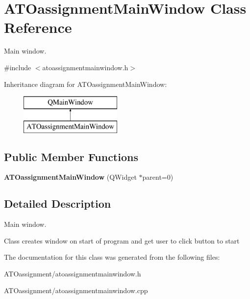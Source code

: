 \hypertarget{class_a_t_oassignment_main_window}{}\section{A\+T\+Oassignment\+Main\+Window Class Reference}
\label{class_a_t_oassignment_main_window}


Main window.  




{\ttfamily \#include $<$atoassignmentmainwindow.\+h$>$}

Inheritance diagram for A\+T\+Oassignment\+Main\+Window\+:\begin{figure}[H]
\begin{center}
\leavevmode
\includegraphics[height=2.000000cm]{class_a_t_oassignment_main_window}
\end{center}
\end{figure}
\subsection*{Public Member Functions}
\begin{DoxyCompactItemize}
\item 
\hypertarget{class_a_t_oassignment_main_window_a443871b5a99b1725e128b0c4186ac66d}{}\label{class_a_t_oassignment_main_window_a443871b5a99b1725e128b0c4186ac66d} 
{\bfseries A\+T\+Oassignment\+Main\+Window} (Q\+Widget $\ast$parent=0)
\end{DoxyCompactItemize}


\subsection{Detailed Description}
Main window. 

Class creates window on start of program and get user to click button to start 

The documentation for this class was generated from the following files\+:\begin{DoxyCompactItemize}
\item 
A\+T\+Oassignment/atoassignmentmainwindow.\+h\item 
A\+T\+Oassignment/atoassignmentmainwindow.\+cpp\end{DoxyCompactItemize}
